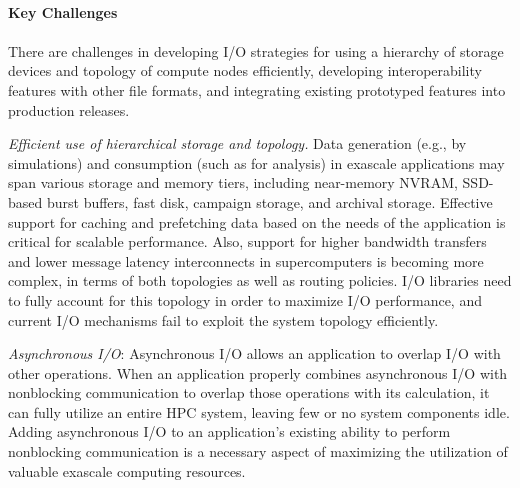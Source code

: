 \paragraph{Key  Challenges}
\paragraph{}
There are challenges in developing I/O strategies for using a hierarchy of storage devices and topology of compute nodes efficiently, developing interoperability features with other file formats, and integrating existing prototyped features into production releases. 

\textit{Efficient use of hierarchical storage and topology.} Data generation (e.g., by simulations) and consumption (such as for analysis) in exascale applications may span various storage and memory tiers, including near-memory NVRAM, SSD-based burst buffers, fast disk, campaign storage, and archival storage. Effective support for caching and prefetching data based on the needs of the application is critical for scalable performance. Also, support for higher bandwidth transfers and lower message latency interconnects in supercomputers is becoming more complex, in terms of both topologies as well as routing policies. I/O libraries need to fully account for this topology in order to maximize I/O performance, and current I/O mechanisms fail to exploit the system topology efficiently.


\textit{Asynchronous I/O}: Asynchronous I/O allows an application to overlap I/O with other operations. When an application properly combines asynchronous I/O with nonblocking communication to overlap those operations with its calculation, it can fully utilize an entire HPC system, leaving few or no system components idle.  Adding asynchronous I/O to an application's existing ability to perform nonblocking communication is a necessary aspect of maximizing the utilization of valuable exascale computing resources.



